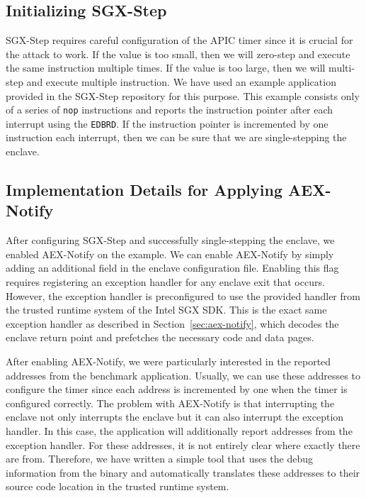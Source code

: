 \documentclass{llncs}
\begin{document}
\subsection{Initializing SGX-Step}


SGX-Step requires careful configuration of the APIC timer
since it is crucial for the attack to work.
If the value is too small, then we will zero-step and execute the same instruction multiple times.
If the value is too large, then we will multi-step and execute multiple instruction.
We have used an example application provided in the SGX-Step repository for this purpose.
This example consists only of a series of \texttt{nop} instructions and
reports the instruction pointer after each interrupt using the \texttt{EDBRD}.
If the instruction pointer is incremented by one instruction each interrupt,
then we can be sure that we are single-stepping the enclave.

\subsection{Implementation Details for Applying AEX-Notify}

After configuring SGX-Step and successfully single-stepping the enclave, we enabled AEX-Notify on the example.
We can enable AEX-Notify by simply adding an additional field in the enclave configuration file.
Enabling this flag requires registering an exception handler for any enclave exit that occurs.
However, the exception handler is preconfigured to use the provided handler
from the trusted runtime system of the Intel SGX SDK.
This is the exact same exception handler as described in Section~\ref{sec:aex-notify},
which decodes the enclave return point and prefetches the necessary code and data pages.

After enabling AEX-Notify, we were particularly interested in the reported addresses from the benchmark application.
Usually, we can use these addresses to configure the timer
since each address is incremented by one when the timer is configured correctly.
The problem with AEX-Notify is that interrupting the enclave not only
interrupts the enclave but it can also interrupt the exception handler.
In this case, the application will additionally report addresses from the exception handler.
For these addresses, it is not entirely clear where exactly there are from.
Therefore, we have written a simple tool that uses the debug information from the binary and
automatically translates these addresses to their source code location in the trusted runtime system.
\end{document}
